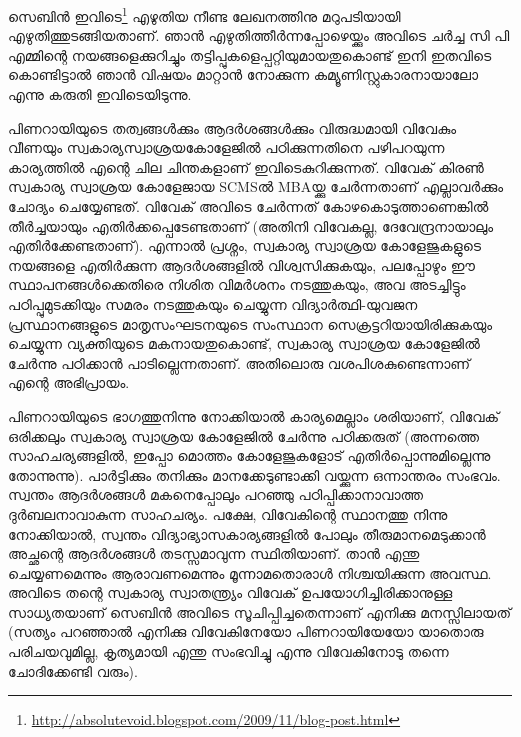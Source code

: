 \vskip 2pt


സെബിന്‍ ഇവിടെ\footnote{\url{http://absolutevoid.blogspot.com/2009/11/blog-post.html}} എഴുതിയ നീണ്ട ലേഖനത്തിനു മറുപടിയായി എഴുതിത്തുടങ്ങിയതാണ്. ഞാന്‍ എഴുതിത്തീര്‍ന്നപ്പോഴെയ്ക്കും അവിടെ ചര്‍ച്ച സി പി എമ്മിന്റെ നയങ്ങളെക്കുറിച്ചും തട്ടിപ്പുകളെപ്പറ്റിയുമായതുകൊണ്ട് ഇനി ഇതവിടെ കൊണ്ടിട്ടാല്‍ ഞാന്‍ വിഷയം മാറ്റാന്‍ നോക്കുന്ന കമ്യൂണിസ്റ്റുകാരനായാലോ എന്നു കരുതി ഇവിടെയിടുന്നു.

പിണറായിയുടെ തത്വങ്ങള്‍ക്കും ആദര്‍ശങ്ങള്‍ക്കും വിരുദ്ധമായി വിവേകും വീണയും സ്വകാര്യസ്വാശ്രയകോളേജില്‍ പഠിക്കുന്നതിനെ പഴിപറയുന്ന കാര്യത്തില്‍ എന്റെ ചില ചിന്തകളാണ് ഇവിടെകുറിക്കുന്നത്. വിവേക് കിരണ്‍ സ്വകാര്യ സ്വാശ്രയ കോളേജായ SCMSല്‍ MBAയ്ക്കു ചേര്‍ന്നതാണ് എല്ലാവര്‍ക്കും ചോദ്യം ചെയ്യേണ്ടത്. വിവേക് അവിടെ ചേര്‍ന്നത് കോഴകൊടുത്താണെങ്കില്‍ തീര്‍ച്ചയായും എതിര്‍ക്കപ്പെടേണ്ടതാണ് (അതിനി വിവേകല്ല, ദേവേന്ദ്രനായാലും എതിര്‍ക്കേണ്ടതാണ്). എന്നാല്‍ പ്രശ്നം, സ്വകാര്യ സ്വാശ്രയ കോളേജുകളുടെ നയങ്ങളെ എതിര്‍ക്കുന്ന ആദര്‍ശങ്ങളില്‍ വിശ്വസിക്കുകയും, പലപ്പോഴും ഈ സ്ഥാപനങ്ങള്‍ക്കെതിരെ നിശിത വിമര്‍ശനം നടത്തുകയും, അവ അടച്ചിട്ടും പഠിപ്പുമുടക്കിയും സമരം നടത്തുകയും ചെയ്യുന്ന വിദ്യാര്‍ത്ഥി-യുവജന പ്രസ്ഥാനങ്ങളുടെ മാതൃസംഘടനയുടെ സംസ്ഥാന സെക്രട്ടറിയായിരിക്കുകയും ചെയ്യുന്ന വ്യക്തിയുടെ മകനായതുകൊണ്ട്, സ്വകാര്യ സ്വാശ്രയ കോളേജില്‍ ചേര്‍ന്നു പഠിക്കാന്‍ പാടില്ലെന്നതാണ്. അതിലൊരു വശപിശകുണ്ടെന്നാണ് എന്റെ അഭിപ്രായം.

പിണറായിയുടെ ഭാഗത്തുനിന്നു നോക്കിയാല്‍ കാര്യമെല്ലാം ശരിയാണ്, വിവേക് ഒരിക്കലും സ്വകാര്യ സ്വാശ്രയ കോളേജില്‍ ചേര്‍ന്നു പഠിക്കരുത് (അന്നത്തെ സാഹചര്യങ്ങളില്‍, ഇപ്പോ മൊത്തം കോളേജുകളോട് എതിര്‍പ്പൊന്നുമില്ലെന്നു തോന്നുന്നു). പാര്‍ട്ടിക്കും തനിക്കും മാനക്കേടുണ്ടാക്കി വയ്ക്കുന്ന ഒന്നാന്തരം സംഭവം. സ്വന്തം ആദര്‍ശങ്ങള്‍ മകനെപ്പോലും പറഞ്ഞു പഠിപ്പിക്കാനാവാത്ത ദുര്‍ബലനാവാകുന്ന സാഹചര്യം. പക്ഷേ, വിവേകിന്റെ സ്ഥാനത്തു നിന്നു നോക്കിയാല്‍, സ്വന്തം വിദ്യാഭ്യാസകാര്യങ്ങളില്‍ പോലും തീരുമാനമെടുക്കാന്‍ അച്ഛന്റെ ആദര്‍ശങ്ങള്‍ തടസ്സമാവുന്ന സ്ഥിതിയാണ്. താന്‍ എന്തു ചെയ്യണമെന്നും ആരാവണമെന്നും മൂന്നാമതൊരാള്‍ നിശ്ചയിക്കുന്ന അവസ്ഥ. അവിടെ തന്റെ സ്വകാര്യ സ്വാതന്ത്ര്യം വിവേക് ഉപയോഗിച്ചിരിക്കാനുള്ള സാധ്യതയാണ് സെബിന്‍ അവിടെ സൂചിപ്പിച്ചതെന്നാണ് എനിക്കു മനസ്സിലായത് (സത്യം പറഞ്ഞാല്‍ എനിക്കു വിവേകിനേയോ പിണറായിയേയോ യാതൊരു പരിചയവുമില്ല, കൃത്യമായി എന്തു സംഭവിച്ചു എന്നു വിവേകിനോടു തന്നെ ചോദിക്കേണ്ടി വരും).

